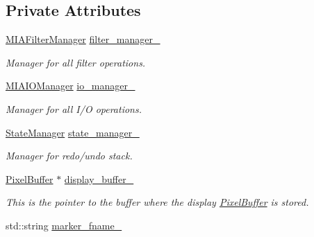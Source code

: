 \subsection*{Private Attributes}
\begin{DoxyCompactItemize}
\item 
\hyperlink{classimage__tools_1_1MIAFilterManager}{M\+I\+A\+Filter\+Manager} \hyperlink{classimage__tools_1_1MIAApp_a5262f7ad8128fe28394613240a9bf656}{filter\+\_\+manager\+\_\+}\hypertarget{classimage__tools_1_1MIAApp_a5262f7ad8128fe28394613240a9bf656}{}\label{classimage__tools_1_1MIAApp_a5262f7ad8128fe28394613240a9bf656}

\begin{DoxyCompactList}\small\item\em Manager for all filter operations. \end{DoxyCompactList}\item 
\hyperlink{classimage__tools_1_1MIAIOManager}{M\+I\+A\+I\+O\+Manager} \hyperlink{classimage__tools_1_1MIAApp_a91bd5102cc5dc63f6a264b011b4741e9}{io\+\_\+manager\+\_\+}\hypertarget{classimage__tools_1_1MIAApp_a91bd5102cc5dc63f6a264b011b4741e9}{}\label{classimage__tools_1_1MIAApp_a91bd5102cc5dc63f6a264b011b4741e9}

\begin{DoxyCompactList}\small\item\em Manager for all I/O operations. \end{DoxyCompactList}\item 
\hyperlink{classimage__tools_1_1StateManager}{State\+Manager} \hyperlink{classimage__tools_1_1MIAApp_a17448a3210b3aa3f16395ee3693518b2}{state\+\_\+manager\+\_\+}\hypertarget{classimage__tools_1_1MIAApp_a17448a3210b3aa3f16395ee3693518b2}{}\label{classimage__tools_1_1MIAApp_a17448a3210b3aa3f16395ee3693518b2}

\begin{DoxyCompactList}\small\item\em Manager for redo/undo stack. \end{DoxyCompactList}\item 
\hyperlink{classimage__tools_1_1PixelBuffer}{Pixel\+Buffer} $\ast$ \hyperlink{classimage__tools_1_1MIAApp_aa82186db2a4f39f5d42ccb7ceb50f056}{display\+\_\+buffer\+\_\+}\hypertarget{classimage__tools_1_1MIAApp_aa82186db2a4f39f5d42ccb7ceb50f056}{}\label{classimage__tools_1_1MIAApp_aa82186db2a4f39f5d42ccb7ceb50f056}

\begin{DoxyCompactList}\small\item\em This is the pointer to the buffer where the display \hyperlink{classimage__tools_1_1PixelBuffer}{Pixel\+Buffer} is stored. \end{DoxyCompactList}\item 
std\+::string \hyperlink{classimage__tools_1_1MIAApp_a291206124f9901005656d58a71b46e23}{marker\+\_\+fname\+\_\+}\hypertarget{classimage__tools_1_1MIAApp_a291206124f9901005656d58a71b46e23}{}\label{classimage__tools_1_1MIAApp_a291206124f9901005656d58a71b46e23}


\end{DoxyCompactItemize}
